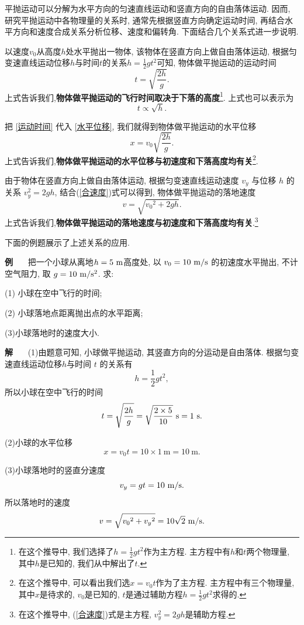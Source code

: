 \documentclass[11pt,a4paper]{ctexbook}
\newcounter{exam}[chapter]
\newcommand{\bre}{\ \ \ }
\newcommand{\examlabel}{\textbf{例\theexam}}
\newcommand{\soln}{\textbf{解}\bre}
\newcommand{\unit}[1]{\ \mathrm{#1}}
\newenvironment{example}{\bigskip\par\refstepcounter{exam}\examlabel\bre}{\par}
\newenvironment{solution}{\par\soln}{\par\bigskip}
\begin{document}
平抛运动可以分解为水平方向的匀速直线运动和竖直方向的自由落体运动. 因而, 研究平抛运动中各物理量的关系时, 通常先根据竖直方向确定运动时间, 再结合水平方向和速度合成关系分析位移、速度和偏转角. 下面结合几个关系式进一步说明.

以速度$v_0$从高度$h$处水平抛出一物体, 该物体在竖直方向上做自由落体运动,
根据匀变速直线运动位移$h$与时间$t$的关系$h=\displaystyle\frac{1}{2}gt^2$可知, 物体做平抛运动的运动时间
\begin{equation}
	\label{运动时间}
	t=\sqrt{\frac{2h}{g}}.
\end{equation}
上式告诉我们,\textbf{物体做平抛运动的飞行时间取决于下落的高度}\footnote{在这个推导中, 我们选择了$h=\displaystyle\frac{1}{2}gt^2$作为主方程.
主方程中有$h$和$t$两个物理量, 其中$h$是已知的, 我们从中解出了$t$.}. 上式也可以表示为$$t\propto \sqrt{h}.$$

把 \eqref{运动时间} 代入 \eqref{水平位移}, 我们就得到物体做平抛运动的水平位移
$$x=v_0\sqrt{\frac{2h}{g}}.$$
上式告诉我们,\textbf{物体做平抛运动的水平位移与初速度和下落高度均有关}\footnote{在这个推导中, 可以看出我们选$x = v_0t$作为了主方程. 主方程中有三个物理量, 其中$x$是待求的,
$v_0$是已知的, $t$是通过辅助方程$h=\displaystyle\frac{1}{2}gt^2$求得的.}.

由于物体在竖直方向上做自由落体运动, 根据匀变速直线运动速度 $v_y$ 与位移 $h$ 的关系 $v_y^2 = 2gh$,
结合(\ref{合速度})式可以得到, 物体做平抛运动的落地速度
$$v=\sqrt{{v_0}^2+2gh}.$$
上式告诉我们,\textbf{物体做平抛运动的落地速度与初速度和下落高度均有关}.\footnote{在这个推导中, (\ref{合速度})式是主方程,
$v_y^2 = 2gh$是辅助方程.}

下面的例题展示了上述关系的应用.

\begin{example}
    把一个小球从离地$h=5\ \rm{m}$高度处, 以 $v_0=10\ \rm{m/s}$ 的初速度水平抛出, 不计空气阻力,
取 $g=10\ \rm{m/s^2}$. 求:

(1) 小球在空中飞行的时间;

(2) 小球落地点距离抛出点的水平距离;

(3)小球落地时的速度大小.
\end{example}
\begin{solution}
    (1)由题意可知, 小球做平抛运动, 其竖直方向的分运动是自由落体.
    根据匀变速直线运动位移$h$与时间 $t$ 的关系有 $$h=\frac12gt^2, $$
    所以小球在空中飞行的时间
    $$t=\sqrt{\frac{2h}{g}}=\sqrt{\frac{2\times5}{10}}\ \rm{s}=1\ \rm{s}.$$

    (2)小球的水平位移 $$x=v_0t=10\times 1\unit{m}=10\unit{m}.$$

    (3)小球落地时的竖直分速度 $$v_y=gt=10\ \rm{m/s}.$$
    所以落地时的速度 $$v=\sqrt{{v_0}^2+{v_y}^2}=10\sqrt2\ \rm{m/s}.$$
\end{solution}
\end{document}
